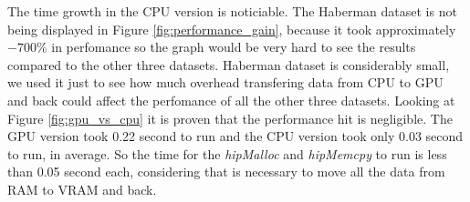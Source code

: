 The time growth in the CPU version is noticiable.
The Haberman dataset is not being displayed in Figure \ref{fig:performance_gain}, because it took approximately $-700\%$
in perfomance so the graph would be very hard to see the results compared to the other three datasets.
Haberman dataset is considerably small, we used it just to see how much overhead transfering data from CPU to GPU and back
could affect the perfomance of all the other three datasets. Looking at Figure \ref{fig:gpu_vs_cpu} it is proven that
the performance hit is negligible. The GPU version took 0.22 second to run and the CPU version took only
0.03 second to run, in average. So the time for the \emph{hipMalloc} and \emph{hipMemcpy} to run is less than 0.05 second each,
considering that is necessary to move all the data from RAM to VRAM and back.
